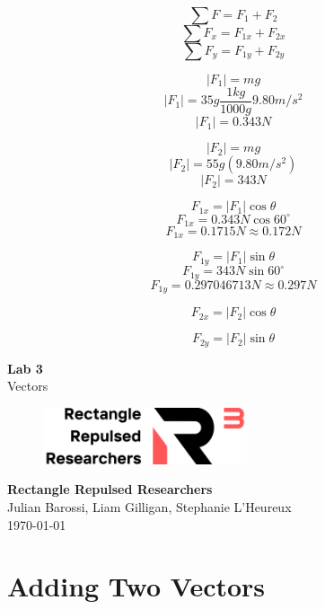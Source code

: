 \documentclass[11pt, letterpaper, includehead]{article}
\begin{document}
$$\sum F = F_{1} + F_{2}$$
$$\sum F_x = F_{1x} + F_{2x}$$
$$\sum F_y = F_{1y} + F_{2y}$$



$$|F_1| = mg$$
$$|F_1| = 35g\frac{1kg}{1000g}9.80m/s^2$$
$$|F_1| = 0.343N$$

$$|F_2| = mg$$
$$|F_2| = 55g(9.80m/s^2)$$
$$|F_2| = 343N$$

$$F_{1x} = |F_1|\cos\theta$$
$$F_{1x} = 0.343N\cos60^{\circ}$$
$$F_{1x} = 0.1715N \approx 0.172N$$

$$F_{1y} = |F_1|\sin\theta$$
$$F_{1y} = 343N\sin60^{\circ}$$
$$F_{1y} = 0.297046713N \approx 0.297N$$

$$F_{2x} = |F_2|\cos\theta$$

$$F_{2y} = |F_2|\sin\theta$$


\begin{titlepage}
  \begin{center}
    \Huge{\textbf{Lab 3}}\\
    \Huge{Vectors}
    \vfill
    \begin{figure}[H] %
      \centering 
      \includegraphics[width=6cm]{../logo.png}
    \end{figure}
    \large{\textbf{Rectangle Repulsed Researchers}}\\
    \large{Julian Barossi, Liam Gilligan, Stephanie L'Heureux}\\
    \vspace{0.5cm}
    \normalsize
    \today
  \end{center}
\end{titlepage}

\tableofcontents
\pagebreak %

\pagestyle{fancy}
\fancyhead{}

\pagebreak 

\section{Adding Two Vectors} %
\end{document}
